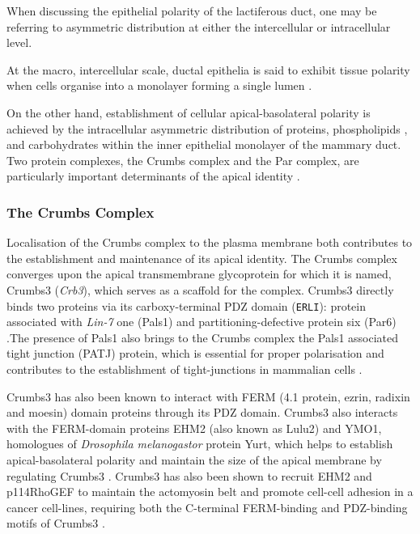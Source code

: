 When discussing the epithelial polarity of the lactiferous duct, one may be referring to asymmetric distribution at either the intercellular or intracellular level.\par

At the macro, intercellular scale, ductal epithelia is said to exhibit tissue
polarity when cells organise into a monolayer forming a single lumen \citep{bissell2003}.\par

On the other hand, establishment of cellular apical-basolateral polarity is
achieved by the intracellular asymmetric distribution of proteins, phospholipids
, and carbohydrates within the inner epithelial monolayer of the mammary duct.
Two protein complexes, the Crumbs complex and the Par complex, are particularly
important determinants of the apical identity \citep{horikoshi2009,whiteman2014}.\par

\subsubsection{The Crumbs Complex}
Localisation of the Crumbs complex to the plasma membrane both contributes to
the establishment and maintenance of its apical identity. The Crumbs complex
converges upon the apical transmembrane glycoprotein for which it is named,
Crumbs3 ({\it Crb3}), which serves as a scaffold for the complex. Crumbs3 directly
binds two proteins via its carboxy-terminal PDZ domain ({\tt ERLI}): protein
associated with {\it Lin-7} one (Pals1) and partitioning-defective protein six (Par6) \citep{lemmers2004, roh2002}.The presence of Pals1 also brings to the Crumbs complex the Pals1 associated tight junction (PATJ) protein, which is essential for proper polarisation and contributes to the establishment of tight-junctions in mammalian cells \citep{shin2005}.\par


Crumbs3 has also been known to interact with FERM (4.1 protein, ezrin,
radixin and moesin) domain proteins through its PDZ domain. Crumbs3 also
interacts with the FERM-domain proteins EHM2 (also known as Lulu2) and YMO1,
homologues of {\it Drosophila melanogastor} protein Yurt, which helps to establish
apical-basolateral polarity and maintain the size of the apical membrane by
regulating Crumbs3 \citep{laprise2006}. Crumbs3 has also
been shown to recruit EHM2 and p114RhoGEF to maintain the actomyosin belt and
promote cell-cell adhesion in a cancer cell-lines, requiring both the C-terminal
FERM-binding and PDZ-binding motifs of Crumbs3 \citep{loie2015}.\par

